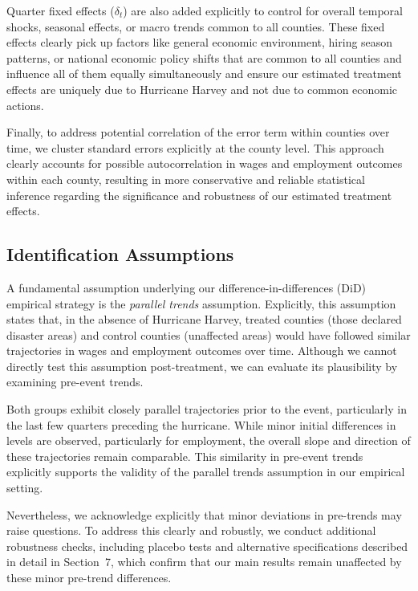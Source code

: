 \documentclass{article}
\begin{document}
Quarter fixed effects (\(\delta_t\)) are also added explicitly to control for overall temporal shocks, seasonal effects, or macro trends common to all counties. These fixed effects clearly pick up factors like general economic environment, hiring season patterns, or national economic policy shifts that are common to all counties and influence all of them equally simultaneously and ensure our estimated treatment effects are uniquely due to Hurricane Harvey and not due to common economic actions.

Finally, to address potential correlation of the error term within counties over time, we cluster standard errors explicitly at the county level. This approach clearly accounts for possible autocorrelation in wages and employment outcomes within each county, resulting in more conservative and reliable statistical inference regarding the significance and robustness of our estimated treatment effects.

\subsection{Identification Assumptions}

A fundamental assumption underlying our difference-in-differences (DiD) empirical strategy is the \textit{parallel trends} assumption. Explicitly, this assumption states that, in the absence of Hurricane Harvey, treated counties (those declared disaster areas) and control counties (unaffected areas) would have followed similar trajectories in wages and employment outcomes over time. Although we cannot directly test this assumption post-treatment, we can evaluate its plausibility by examining pre-event trends.

Both groups exhibit closely parallel trajectories prior to the event, particularly in the last few quarters preceding the hurricane. While minor initial differences in levels are observed, particularly for employment, the overall slope and direction of these trajectories remain comparable. This similarity in pre-event trends explicitly supports the validity of the parallel trends assumption in our empirical setting.

Nevertheless, we acknowledge explicitly that minor deviations in pre-trends may raise questions. To address this clearly and robustly, we conduct additional robustness checks, including placebo tests and alternative specifications described in detail in Section~7, which confirm that our main results remain unaffected by these minor pre-trend differences.
\end{document}
